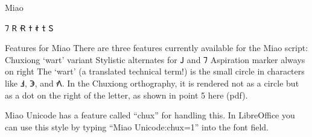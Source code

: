 \newfontfamily{}

\begin{scriptexample}[]{Miao}
\end{scriptexample}

{\miao 𖼴	𖼵	𖼶	𖼷	𖼸	𖼹	𖼺	}

Features for Miao
There are three features currently available for the Miao script:
\bgroup
\miao
Chuxiong ‘wart’ variant
Stylistic alternates for 𖼳 and 𖼴
Aspiration marker always on right
The ‘wart’ (a translated technical term!) is the small circle in characters like 𖼁, 𖼅, and 𖼾. In the Chuxiong orthography, it is rendered not as a circle but as a dot on the right of the letter, as shown in point 5 here (pdf).

Miao Unicode has a feature called “chux” for handling this. In LibreOffice you can use this style by typing “Miao Unicode:chux=1” into the font field.